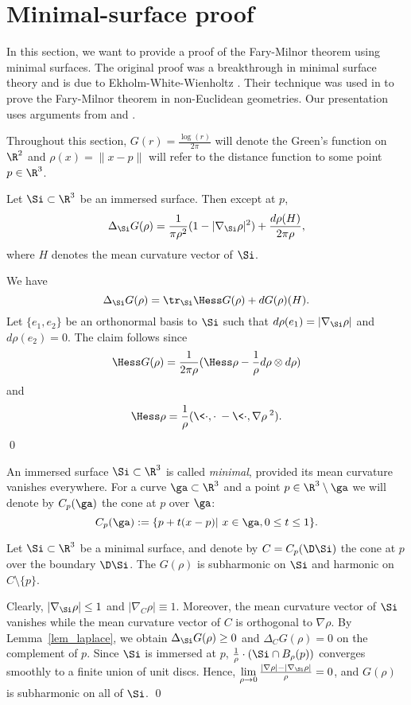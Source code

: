 \section{Minimal-surface proof}

In this section, we want to provide a proof of the Fary-Milnor theorem using minimal surfaces.
The original proof was a breakthrough in minimal surface theory and is due to Ekholm-White-Wienholtz \cite{EWW_embed}. 
Their technique was used in \cite{CG_embed, St_structure} to prove the Fary-Milnor theorem in
non-Euclidean geometries. Our presentation uses arguments from \cite{EWW_embed} and \cite{CG_embed}.
\medskip

Throughout this section, $G(r)=\frac{\log(r)}{2\pi}$ will denote the Green's function on $\R^2$ and  $\rho(x)=\|x-p\|$ will refer to
the distance function to some point $p\in\R^3$.

\blem\label{lem_laplace} 
Let $\Si\subset \R^3$ be an immersed surface. Then except at $p$,
\[\Delta_\Si G(\rho)=\frac{1}{\pi\rho^2}(1-|\nabla_\Si \rho|^2)+\frac{d\rho(H)}{2\pi\rho},\]
where $H$ denotes the mean curvature vector of $\Si$. 
\elem

\proof
We have
\[\Delta_\Si G(\rho)=\tr_\Si\Hess G(\rho)+d G(\rho)(H).\]
Let $\{e_1,e_2\}$ be an orthonormal basis to $\Si$ such that $d\rho(e_1)=|\nabla_\Si \rho|$ and $d\rho(e_2)=0$. 
The claim follows since 
\[\Hess G(\rho)=\frac{1}{2\pi\rho}(\Hess\rho-\frac{1}{\rho}d\rho\otimes d\rho)\] 
and
\[\Hess\rho=\frac{1}{\rho}(\<\cdot,\cdot\>-\<\cdot,\nabla\rho\>^2).\]
\qed

\bdfn
An immersed surface $\Si\subset\R^3$ is called {\em minimal}, provided its mean curvature vanishes everywhere.
\edfn
For a curve $\ga\subset\R^3$ and a point $p\in\R^3\setminus\ga$ we will denote by $C_p(\ga)$ the cone at $p$
over $\ga$:
\[C_p(\ga):=\{p+t(x-p)|\ x\in\ga, 0\leq t\leq 1\}.\]
\medskip

\bcor\label{cor_subhar}
Let $\Si\subset\R^3$ be a minimal surface, and denote by $C=C_p(\D\Si)$ the cone at $p$ over the boundary $\D\Si$.
The $G(\rho)$ is subharmonic on $\Si$ and harmonic on $C\setminus\{p\}$.
\ecor

\proof
Clearly, $|\nabla_\Si\rho|\leq 1$ and $|\nabla_C\rho|\equiv 1$.
Moreover, the mean curvature vector of $\Si$ vanishes while the mean curvature vector of $C$
is orthogonal to $\nabla\rho$. By Lemma~\ref{lem_laplace}, we obtain $\Delta_\Si G(\rho)\geq 0$ and $\Delta_C G(\rho)= 0$
on the complement of $p$. Since $\Si$ is immersed at $p$, $\frac{1}{\rho}\cdot(\Si\cap B_\rho(p))$
converges smoothly to a finite union of unit discs. Hence, $\lim\limits_{\rho\to 0}\frac{|\nabla\rho|-|\nabla_\Si\rho|}{\rho}=0$, and
$G(\rho)$ is subharmonic on all of $\Si$.
\qed



